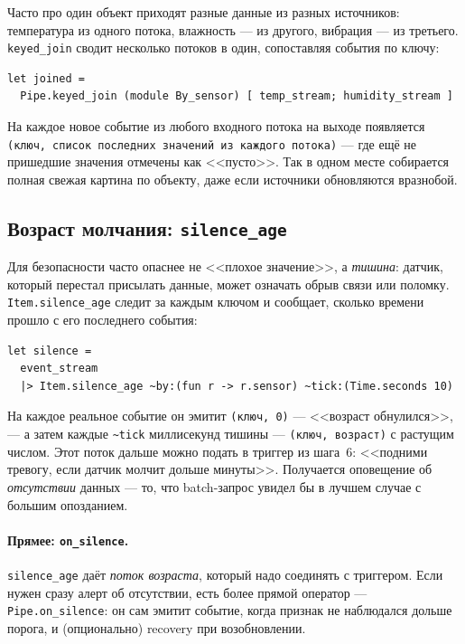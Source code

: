 \documentclass[11pt,a4paper]{article}
\begin{document}
Часто про один объект приходят разные данные из разных источников:
температура из одного потока, влажность --- из другого, вибрация ---
из третьего. \texttt{keyed\_join} сводит несколько потоков в один,
сопоставляя события по ключу:

\begin{lstlisting}
let joined =
  Pipe.keyed_join (module By_sensor) [ temp_stream; humidity_stream ]
\end{lstlisting}

На каждое новое событие из любого входного потока на выходе появляется
\texttt{(ключ, список последних значений из каждого потока)} --- где
ещё не пришедшие значения отмечены как <<пусто>>. Так в одном месте
собирается полная свежая картина по объекту, даже если источники
обновляются вразнобой.

\subsection{Возраст молчания: \texttt{silence\_age}}

Для безопасности часто опаснее не <<плохое значение>>, а \emph{тишина}:
датчик, который перестал присылать данные, может означать обрыв связи
или поломку. \texttt{Item.silence\_age} следит за каждым ключом и
сообщает, сколько времени прошло с его последнего события:

\begin{lstlisting}
let silence =
  event_stream
  |> Item.silence_age ~by:(fun r -> r.sensor) ~tick:(Time.seconds 10)
\end{lstlisting}

На каждое реальное событие он эмитит \texttt{(ключ, 0)} --- <<возраст
обнулился>>, --- а затем каждые \texttt{\textasciitilde{}tick}
миллисекунд тишины --- \texttt{(ключ, возраст)} с растущим числом. Этот
поток дальше можно подать в триггер из шага~6: <<подними тревогу, если
датчик молчит дольше минуты>>. Получается оповещение об \emph{отсутствии}
данных --- то, что batch-запрос увидел бы в лучшем случае с большим
опозданием.

\paragraph{Прямее: \texttt{on\_silence}.} \texttt{silence\_age} даёт
\emph{поток возраста}, который надо соединять с триггером. Если нужен
сразу алерт об отсутствии, есть более прямой оператор ---
\texttt{Pipe.on\_silence}: он сам эмитит событие, когда признак не
наблюдался дольше порога, и (опционально) recovery при возобновлении.
\end{document}
